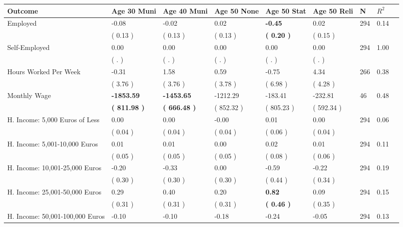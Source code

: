 \begin{tabular}{L{6.2cm} C{1.8cm} C{1.8cm} C{1.8cm} C{1.8cm} C{1.8cm} C{1.8cm} C{0.3cm} C{0.3cm}}
\toprule
 \textbf{Outcome} & \textbf{Age 30 Muni} & \textbf{Age 40 Muni} & \textbf{Age 50 None} & \textbf{Age 50 Stat} & \textbf{Age 50 Reli} & \textbf{N} & \textbf{$ R^2$} \\
\midrule
Employed &     -0.08 &     -0.02 &      0.02 & \textbf{    -0.45} &      0.02  & 294 &       0.14 \\ 
 & (     0.13 ) & (     0.13 ) & (     0.13 ) & \textbf{(     0.20 )} & (     0.15 )  & \\
Self-Employed &      0.00 &      0.00 &      0.00 &      0.00 &      0.00  & 294 &       1.00 \\ 
 & (        . ) & (        . ) & (        . ) & (        . ) & (        . )  & \\
Hours Worked Per Week &     -0.31 &      1.58 &      0.59 &     -0.75 &      4.34  & 266 &       0.38 \\ 
 & (     3.76 ) & (     3.76 ) & (     3.78 ) & (     6.98 ) & (     4.28 )  & \\
Monthly Wage & \textbf{ -1853.59} & \textbf{ -1453.65} &  -1212.29 &   -183.41 &   -232.81  & 46 &       0.48 \\ 
 & \textbf{(   811.98 )} & \textbf{(   666.48 )} & (   852.32 ) & (   805.23 ) & (   592.34 )  & \\
H. Income: 5,000 Euros of Less &      0.00 &      0.00 &     -0.00 &      0.01 &      0.00  & 294 &       0.06 \\ 
 & (     0.04 ) & (     0.04 ) & (     0.04 ) & (     0.06 ) & (     0.04 )  & \\
H. Income: 5,001-10,000 Euros &      0.01 &      0.01 &      0.00 &      0.02 &      0.01  & 294 &       0.11 \\ 
 & (     0.05 ) & (     0.05 ) & (     0.05 ) & (     0.08 ) & (     0.06 )  & \\
H. Income: 10,001-25,000 Euros &     -0.20 &     -0.33 &      0.00 &     -0.59 &     -0.22  & 294 &       0.19 \\ 
 & (     0.30 ) & (     0.30 ) & (     0.30 ) & (     0.44 ) & (     0.34 )  & \\
H. Income: 25,001-50,000 Euros &      0.29 &      0.40 &      0.20 & \textbf{     0.82} &      0.09  & 294 &       0.15 \\ 
 & (     0.31 ) & (     0.31 ) & (     0.31 ) & \textbf{(     0.46 )} & (     0.35 )  & \\
H. Income: 50,001-100,000 Euros &     -0.10 &     -0.10 &     -0.18 &     -0.24 &     -0.05  & 294 &       0.13 \\ 

\end{tabular}
